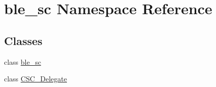 \hypertarget{namespaceble__sc}{}\section{ble\+\_\+sc Namespace Reference}
\label{namespaceble__sc}
\subsection*{Classes}
\begin{DoxyCompactItemize}
\item 
class \hyperlink{classble__sc_1_1ble__sc}{ble\+\_\+sc}
\item 
class \hyperlink{classble__sc_1_1CSC__Delegate}{C\+S\+C\+\_\+\+Delegate}
\end{DoxyCompactItemize}

